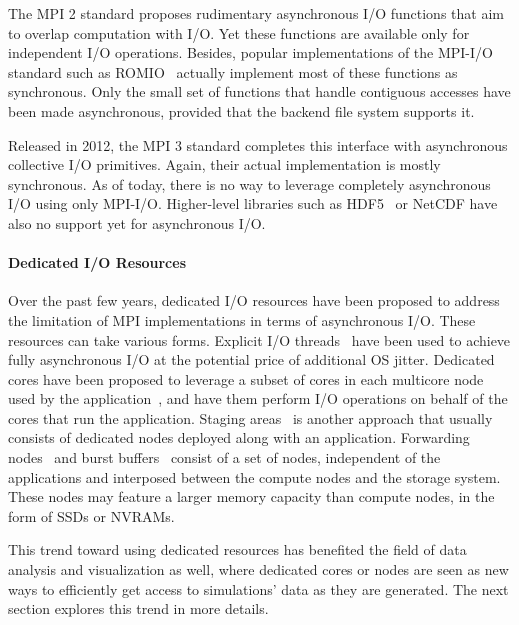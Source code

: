 				The MPI 2 standard proposes rudimentary asynchronous I/O functions
				that aim to overlap computation with I/O. Yet these functions are available only 
				for independent I/O operations. Besides, popular implementations of the MPI-I/O
				standard such as ROMIO~\cite{thakur1999on} actually implement most of these functions
				as synchronous. Only the small set of functions that handle contiguous accesses have
				been made asynchronous, provided that the backend file system supports it.
	
				Released in 2012, the MPI 3 standard completes this interface with asynchronous 
				collective I/O primitives. Again, their actual implementation is mostly synchronous.
				As of today, there is no way to leverage completely asynchronous I/O using only MPI-I/O.
				Higher-level libraries such as HDF5~\cite{hdf5,folk1999hdf5} or NetCDF \cite{netcdf} 
				have also no support yet for asynchronous I/O.
			
			\paragraph{Dedicated I/O Resources}
				Over the past few years, dedicated I/O resources have been proposed to address the
				limitation of MPI implementations in terms of asynchronous I/O. These resources can take various forms. 
				Explicit I/O threads~\cite{fu2012iothreads} have been used to achieve fully asynchronous
				I/O at the potential price of additional OS jitter.
				Dedicated cores have been proposed to leverage a subset of cores in each multicore node used 
				by the application~\cite{dorier2012damaris,li2010functional}, and have them perform I/O operations on behalf of the
				cores that run the application. Staging areas~\cite{abbasi2009datastager,nisar2009scaling,prabhakar2011provisioning} is another
				approach that usually consists of dedicated nodes deployed along with an application.
				Forwarding nodes~\cite{ali2009scalable,stone2006pdio} and burst buffers~\cite{liu2012role,ma2006highlevel} consist of a set 
				of nodes, independent of the applications and interposed between the compute nodes 
				and the storage system. These nodes may feature a larger memory capacity than compute nodes,
				in the form of SSDs or NVRAMs.
				
				This trend toward using dedicated resources has benefited the field of data
				analysis and visualization as well, where dedicated cores or nodes are seen as new ways to 
				efficiently get access to simulations' data as they are generated. The next section
				explores this trend in more details.
				

